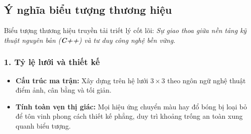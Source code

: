 \documentclass[12pt,a4paper]{article}
\begin{document}
\subsection{Ý nghĩa biểu tượng thương hiệu}
Biểu tượng thương hiệu truyền tải triết lý cốt lõi: \textit{Sự giao thoa giữa nền tảng kỹ thuật nguyên bản (\textbf{C++}) và tư duy công nghệ bền vững}.

\subsubsection*{1. Tỷ lệ lưới và thiết kế}
\begin{itemize}
    \item \textbf{Cấu trúc ma trận:} Xây dựng trên hệ lưới $3\times3$ theo ngôn ngữ nghệ thuật điểm ảnh, cân bằng và tối giản.
    \item \textbf{Tính toàn vẹn thị giác:} Mọi hiệu ứng chuyển màu hay đổ bóng bị loại bỏ để tôn vinh phong cách thiết kế phẳng, duy trì khoảng trống an toàn xung quanh biểu tượng.
\end{itemize}
\end{document}
